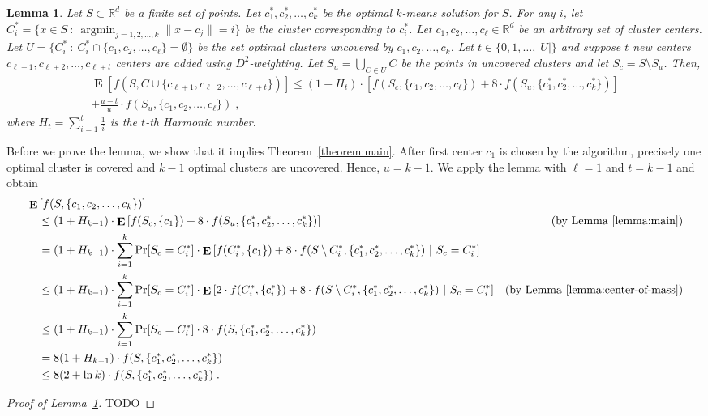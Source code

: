 \documentclass{article}
\newtheorem{lemma}{Lemma}
\newcommand{\R}{\mathbb{R}}
\newcommand{\norm}[1]{\|{#1}\|}
\DeclareMathOperator*{\argmin}{argmin}
\DeclareMathOperator*{\Exp}{\mathbf{E}}
\begin{document}
\begin{lemma}
\label{lemma:main}
Let $S \subset \R^d$ be a finite set of points. Let $c^*_1, c^*_2, \dots, c^*_k$
be the optimal $k$-means solution for $S$. For any $i$, let $C^*_i = \{ x \in S ~:~
\argmin_{j=1,2,\dots,k} \norm{x - c_j} = i\}$ be the cluster corresponding to
$c^*_i$. Let $c_1, c_2, \dots, c_\ell \in \R^d$ be an arbitrary set of cluster
centers. Let $U = \{ C_i^* ~:~ C_i^* \cap \{c_1, c_2, \dots, c_\ell\} =
\emptyset \}$ be the set optimal clusters uncovered by $c_1, c_2, \dots, c_k$.
Let $t \in \{0, 1, \dots, |U|\}$ and suppose $t$ new centers $c_{\ell+1},
c_{\ell+2}, \dots, c_{\ell+t}$ centers are added using $D^2$-weighting. Let $S_u =
\bigcup_{C \in U} C$ be the points in uncovered clusters and let $S_c = S
\setminus S_u$. Then,
\begin{multline*}
\Exp \left[ f(S, C \cup \{c_{\ell+1}, c_{\ell_+2}, \dots, c_{\ell+t}\}) \right]
\le (1 + H_t) \cdot \left[f(S_c, \{c_1, c_2, \dots, c_\ell\}) + 8 \cdot f(S_u, \{c^*_1, c^*_2, \dots, c^*_k\}) \right] \\
 + \frac{u-t}{u} \cdot f(S_u, \{c_1, c_2, \dots, c_\ell\} ) \; ,
\end{multline*}
where $H_t = \sum_{i=1}^t \frac{1}{i}$ is the $t$-th Harmonic number.
\end{lemma}

Before we prove the lemma, we show that it implies Theorem~\ref{theorem:main}.
After first center $c_1$ is chosen by the algorithm, precisely one optimal cluster
is covered and $k-1$ optimal clusters are uncovered. Hence, $u=k-1$.
We apply the lemma with $\ell=1$ and $t=k-1$ and obtain
\begin{align*}
& \Exp \left[ f(S, \{c_1, c_2, \dots, c_k\}) \right] \\
& \quad \le (1 + H_{k-1}) \cdot \Exp\left[f(S_c, \{c_1\}) + 8 \cdot f(S_u, \{c^*_1, c^*_2, \dots, c^*_k\}) \right] & \text{(by Lemma~\ref{lemma:main})} \\
& \quad = (1 + H_{k-1}) \cdot \sum_{i=1}^k \Pr[S_c = C^*_i] \cdot \Exp\left[f(C^*_i, \{c_1\}) + 8 \cdot f(S \setminus C^*_i, \{c^*_1, c^*_2, \dots, c^*_k\}) ~\middle|~ S_c = C^*_i \right] \\
& \quad \le (1 + H_{k-1}) \cdot \sum_{i=1}^k \Pr[S_c = C^*_i] \cdot \Exp\left[2 \cdot f(C^*_i, \{c^*_i\}) + 8 \cdot f(S \setminus C^*_i, \{c^*_1, c^*_2, \dots, c^*_k\}) ~\middle|~ S_c = C^*_i \right] & \text{(by Lemma~\ref{lemma:center-of-mass})}  \\
& \quad \le (1 + H_{k-1}) \cdot \sum_{i=1}^k \Pr[S_c = C^*_i] \cdot 8 \cdot f(S, \{c^*_1, c^*_2, \dots, c^*_k\}) \\
& \quad = 8 (1 + H_{k-1}) \cdot f(S, \{c^*_1, c^*_2, \dots, c^*_k\}) \\
& \quad \le 8 (2 + \ln k) \cdot f(S, \{c^*_1, c^*_2, \dots, c^*_k\}) \; .
\end{align*}

\begin{proof}[Proof of Lemma~\ref{lemma:main}]
TODO
\end{proof}
\end{document}
